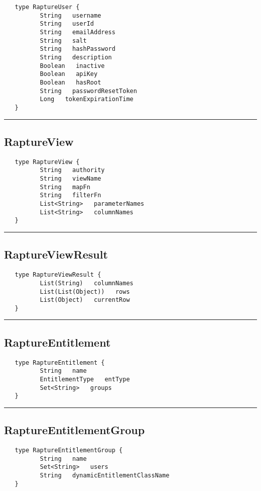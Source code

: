\begin{verbatim}
   type RaptureUser {
          String   username
          String   userId
          String   emailAddress
          String   salt
          String   hashPassword
          String   description
          Boolean   inactive
          Boolean   apiKey
          Boolean   hasRoot
          String   passwordResetToken
          Long   tokenExpirationTime
   }
\end{verbatim}

\rule{15cm}{2pt}
\subsection{RaptureView}
\label{type:RaptureView}

\begin{verbatim}
   type RaptureView {
          String   authority
          String   viewName
          String   mapFn
          String   filterFn
          List<String>   parameterNames
          List<String>   columnNames
   }
\end{verbatim}

\rule{15cm}{2pt}
\subsection{RaptureViewResult}
\label{type:RaptureViewResult}

\begin{verbatim}
   type RaptureViewResult {
          List(String)   columnNames
          List(List(Object))   rows
          List(Object)   currentRow
   }
\end{verbatim}

\rule{15cm}{2pt}
\subsection{RaptureEntitlement}
\label{type:RaptureEntitlement}

\begin{verbatim}
   type RaptureEntitlement {
          String   name
          EntitlementType   entType
          Set<String>   groups
   }
\end{verbatim}

\rule{15cm}{2pt}
\subsection{RaptureEntitlementGroup}
\label{type:RaptureEntitlementGroup}

\begin{verbatim}
   type RaptureEntitlementGroup {
          String   name
          Set<String>   users
          String   dynamicEntitlementClassName
   }
\end{verbatim}

